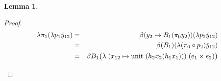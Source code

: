 \documentclass[12pt,a4paper]{article}
\newtheorem*{lemma*}{Lemma}
\theoremstyle{remark}
\newcommand{\bind}{\beta}
\newcommand{\lift}{\lambda}
\newcommand{\hy}{\hat{y}}
\newcommand{\unitW}{\mathrm{unit}}
\begin{document}
\begin{lemma*}
\end{lemma*}
\begin{proof}
\begin{eqnarray*}
\lift \pi_1 (\lift p_1 \hy_{12})
  &=& \bind (y_2 \mapsto B_1 (\pi_0 y_2)) (\lift p_2 \hy_{12}) \\
  &=& \bind (B_1) (\lift (\pi_0\circ p_2)\hy_{12}) \\
  &=& \bind B_1 \bigl(\lift\;(x_{12} \mapsto \unitW\ (h_2 x_2 (h_1 x_1)))\;(e_1\times e_2) \bigr) \\[2\jot]
\end{eqnarray*}
\end{proof}
\end{document}
